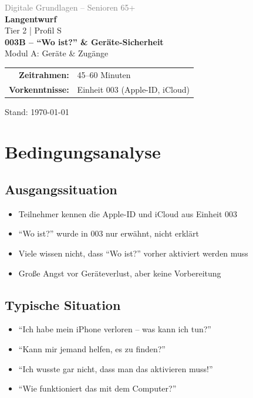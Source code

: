 \documentclass[11pt,a4paper]{article}
\begin{document}
\begin{titlepage}
    \centering
    \vspace*{2cm}
    {\Large\textcolor{gray}{Digitale Grundlagen -- Senioren 65+}}\\[2cm]
    {\Huge\textcolor{fach}{\textbf{Langentwurf}}}\\[0.5cm]
    {\large Tier 2 | Profil S}\\[2cm]
    {\LARGE\textbf{003B -- ``Wo ist?'' \& Geräte-Sicherheit}}\\[0.5cm]
    {\large Modul A: Geräte \& Zugänge}\\[2cm]
    \begin{tabular}{rl}
        \textbf{Zeitrahmen:} & 45--60 Minuten \\
        \textbf{Vorkenntnisse:} & Einheit 003 (Apple-ID, iCloud) \\
    \end{tabular}
    \vfill
    {\normalsize Stand: \today}
\end{titlepage}

\tableofcontents
\newpage

\section{Bedingungsanalyse}

\subsection{Ausgangssituation}
\begin{itemize}
    \item Teilnehmer kennen die Apple-ID und iCloud aus Einheit 003
    \item ``Wo ist?'' wurde in 003 nur erwähnt, nicht erklärt
    \item Viele wissen nicht, dass ``Wo ist?'' vorher aktiviert werden muss
    \item Große Angst vor Geräteverlust, aber keine Vorbereitung
\end{itemize}

\subsection{Typische Situation}
\begin{itemize}
    \item ``Ich habe mein iPhone verloren -- was kann ich tun?''
    \item ``Kann mir jemand helfen, es zu finden?''
    \item ``Ich wusste gar nicht, dass man das aktivieren muss!''
    \item ``Wie funktioniert das mit dem Computer?''
\end{itemize}
\end{document}
